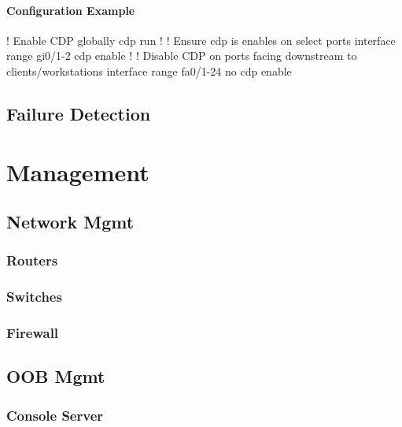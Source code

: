 \subsubsection{Configuration Example}

\begin{cisco}
! Enable CDP globally
cdp run
!
! Ensure cdp is enables on select ports
interface range gi0/1-2
 cdp enable
!
! Disable CDP on ports facing downstream to clients/workstations
interface range fa0/1-24
 no cdp enable
\end{cisco}

\section{Failure Detection}

\chapter{Management}

\section{Network Mgmt}

\subsection{Routers}

\subsection{Switches}

\subsection{Firewall}

\section{OOB Mgmt}

\subsection{Console Server}

